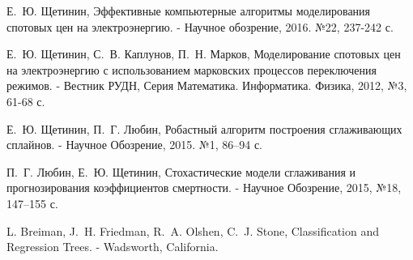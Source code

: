 \documentclass[60x84/16,8pt]{ittmm}
\begin{document}
\begin{thebibliography}{99}

Е.~Ю. Щетинин, Эффективные компьютерные алгоритмы моделирования спотовых цен на электроэнергию. - Научное обозрение, 2016. №22, 237-242 с.

Е.~Ю. Щетинин, С.~В. Каплунов, П.~Н. Марков, Моделирование спотовых цен на электроэнергию с использованием марковских процессов переключения режимов. - Вестник РУДН, Серия Математика. Информатика. Физика, 2012, №3, 61-68 с.

Е.~Ю. Щетинин, П.~Г. Любин, Робастный алгоритм построения сглаживающих сплайнов. - Научное Обозрение, 2015. №1, 86–94 с.

П.~Г. Любин, Е.~Ю. Щетинин, Стохастические модели сглаживания и прогнозирования коэффициентов смертности. - Научное Обозрение, 2015, №18, 147–155 с.

L. Breiman, J.~H. Friedman, R.~A. Olshen, C.~J. Stone, Classification and Regression Trees. - Wadsworth, California.

\end{thebibliography}


% 
% 


\makealttitle      
\end{document}
